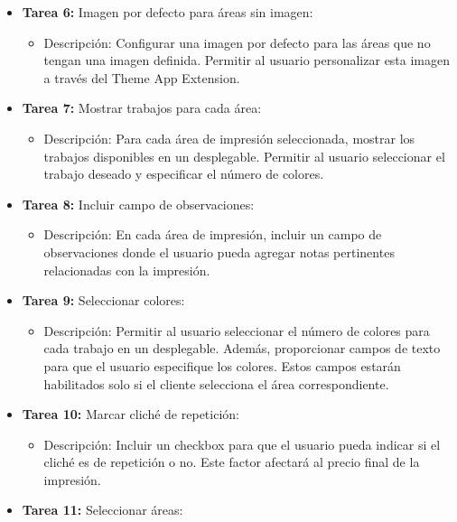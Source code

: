 \documentclass[12pt]{article}
\begin{document}
\begin{itemize}
\begin{itemize}[label=--]
          \end{itemize}
    \item \textbf{Tarea 6:} Imagen por defecto para áreas sin imagen:
          \begin{itemize}[label=--]
              \item Descripción: Configurar una imagen por defecto para las áreas que no tengan una imagen definida. Permitir al usuario personalizar esta imagen a través del Theme App Extension.
          \end{itemize}
    \item \textbf{Tarea 7:} Mostrar trabajos para cada área:
          \begin{itemize}[label=--]
              \item Descripción: Para cada área de impresión seleccionada, mostrar los trabajos disponibles en un desplegable. Permitir al usuario seleccionar el trabajo deseado y especificar el número de colores.
          \end{itemize}
    \item \textbf{Tarea 8:} Incluir campo de observaciones:
          \begin{itemize}[label=--]
              \item Descripción: En cada área de impresión, incluir un campo de observaciones donde el usuario pueda agregar notas pertinentes relacionadas con la impresión.
          \end{itemize}
    \item \textbf{Tarea 9:} Seleccionar colores:
          \begin{itemize}[label=--]
              \item Descripción: Permitir al usuario seleccionar el número de colores para cada trabajo en un desplegable. Además, proporcionar campos de texto para que el usuario especifique los colores. Estos campos estarán habilitados solo si el cliente selecciona el área correspondiente.
          \end{itemize}
    \item \textbf{Tarea 10:} Marcar cliché de repetición:
          \begin{itemize}[label=--]
              \item Descripción: Incluir un checkbox para que el usuario pueda indicar si el cliché es de repetición o no. Este factor afectará al precio final de la impresión.
          \end{itemize}
    \item \textbf{Tarea 11:} Seleccionar áreas:

\end{itemize}
\end{document}
